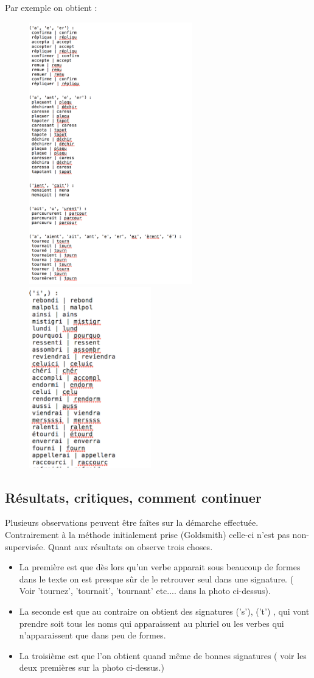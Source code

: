 \documentclass[11pt, oneside]{article}   	%
\begin{document}
Par exemple on obtient : 
\begin{figure}[!h]
\centering
\includegraphics[width = 200pt]{example_sig.png}
\includegraphics[width = 150pt]{example_sig3.png}
\end{figure}

\subsection{Résultats, critiques, comment continuer}


Plusieurs observations peuvent être faîtes sur la démarche effectuée. Contrairement à la méthode initialement prise (Goldsmith) celle-ci n'est pas non-supervisée. Quant aux résultats on observe trois choses.
\begin{itemize} 
\item La première est que dès lors qu'un verbe apparait sous beaucoup de formes dans le texte on est presque sûr de le retrouver seul dans une signature. ( Voir 'tournez', 'tournait', 'tournant' etc.... dans la photo ci-dessus).
\item La seconde est que au contraire on obtient des signatures ('s'), ('t') , qui vont prendre soit tous les noms qui apparaissent au pluriel ou les verbes qui n'apparaissent que dans peu de formes. 
\item La troisième est que l'on obtient quand même de bonnes signatures ( voir les deux premières sur la photo ci-dessus.)
\end{itemize}
\end{document}

